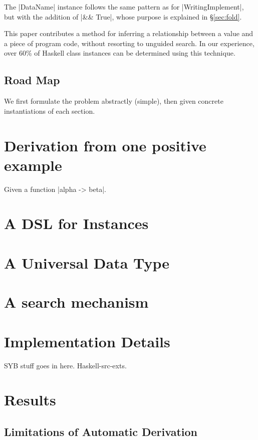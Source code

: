 \documentclass[preprint]{sigplanconf}
\begin{document}
The |DataName| instance follows the same pattern as for |WritingImplement|, but with the addition of |&& True|, whose purpose is explained in \S\ref{sec:fold}.

This paper contributes a method for inferring a relationship between a value and a piece of program code, without resorting to unguided search. In our experience, over 60\% of Haskell class instances can be determined using this technique.

\subsection{Road Map}

We first formulate the problem abstractly (simple), then given concrete instantiations of each section.

\section{Derivation from one positive example}

Given a function |alpha -> beta|. 


\section{A DSL for Instances}

\section{A Universal Data Type}

\section{A search mechanism}

\section{Implementation Details}

SYB stuff goes in here. Haskell-src-exts.

\section{Results}

\subsection{Limitations of Automatic Derivation}
\label{sec:automatic_failure}
\end{document}
